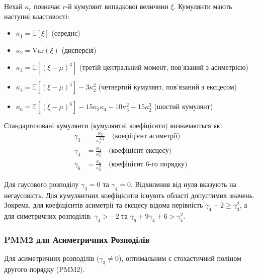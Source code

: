 \documentclass[12pt,a4paper]{article}
\begin{document}
Нехай $\kappa_r$ позначає $r$-й кумулянт випадкової величини $\xi$. Кумулянти мають наступні властивості:

\begin{itemize}
    \item $\kappa_1 = \mathbb{E}[\xi]$ (середнє)
    \item $\kappa_2 = \text{Var}(\xi)$ (дисперсія)
    \item $\kappa_3 = \mathbb{E}[(\xi - \mu)^3]$ (третій центральний момент, пов'язаний з асиметрією)
    \item $\kappa_4 = \mathbb{E}[(\xi - \mu)^4] - 3\kappa_2^2$ (четвертий кумулянт, пов'язаний з ексцесом)
    \item $\kappa_6 = \mathbb{E}[(\xi - \mu)^6] - 15\kappa_2\kappa_4 - 10\kappa_3^2 - 15\kappa_2^3$ (шостий кумулянт)
\end{itemize}

Стандартизовані кумулянти (кумулянтні коефіцієнти) визначаються як:
\begin{align}
\gamma_3 &= \frac{\kappa_3}{\kappa_2^{3/2}} \quad \text{(коефіцієнт асиметрії)} \label{eq:skewness} \\
\gamma_4 &= \frac{\kappa_4}{\kappa_2^{2}} \quad \text{(коефіцієнт ексцесу)} \label{eq:kurtosis} \\
\gamma_6 &= \frac{\kappa_6}{\kappa_2^{3}} \quad \text{(коефіцієнт 6-го порядку)} \label{eq:sixth_cumulant}
\end{align}

Для гаусового розподілу $\gamma_3 = 0$ та $\gamma_4 = 0$. Відхилення від нуля вказують на негаусовість. Для кумулянтних коефіцієнтів існують області допустимих значень. Зокрема, для коефіцієнтів асиметрії та ексцесу відома нерівність $\gamma_4 + 2 \geq \gamma_3^2$, а для симетричних розподілів: $\gamma_4 > -2$ та $\gamma_6 + 9\gamma_4 + 6 > \gamma_4^2$.

\subsubsection{PMM2 для Асиметричних Розподілів}

Для асиметричних розподілів ($\gamma_3 \neq 0$), оптимальним є стохастичний поліном другого порядку (PMM2).
\end{document}
